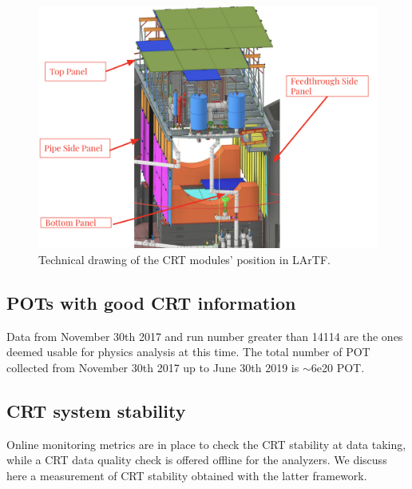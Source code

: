 \begin{figure}[h!]
\centering
\includegraphics[scale=0.3]{images/CRTScheme}
\caption{Technical drawing of the CRT modules' position in LArTF.}
\label{fig:CRT}
\end{figure}

\subsection{POTs with good CRT information}
Data from November 30th 2017 and run number greater than 14114 are the ones deemed usable for physics analysis at this time. The total number of POT collected from November 30th 2017 up to June 30th 2019 is $\sim$6e20 POT.  



\subsection{CRT system stability}
Online monitoring metrics are in place to check the CRT stability at data taking, while a CRT data quality check is offered offline for the analyzers. We discuss here a measurement of CRT stability obtained with the latter framework.

